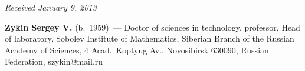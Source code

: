 \vspace*{-6pt}

\hfill{\small\textit{Received January 9, 2013}}

\vspace*{-18pt}

\Contrl

\noindent
\textbf{Zykin Sergey V.} (b.\ 1959)~--- Doctor of sciences in technology,
professor, Head of laboratory, Sobolev Institute of Mathematics, Siberian
Branch of the Russian Academy of Sciences,  4 Acad.\ Koptyug Av., Novosibirsk 630090,
Russian Federation,  szykin@mail.ru





 \label{end\stat}
 
\renewcommand{\bibname}{\protect\rm Литература}  
